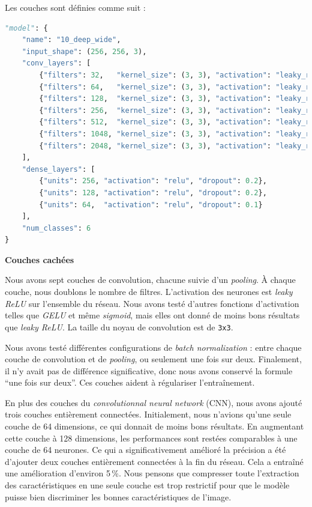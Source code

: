 \documentclass{article}
\begin{document}
Les couches sont définies comme suit :
\begin{lstlisting}[language=Python]
"model": {
    "name": "10_deep_wide",
    "input_shape": (256, 256, 3),
    "conv_layers": [
        {"filters": 32,   "kernel_size": (3, 3), "activation": "leaky_relu", "use_batchnorm": True},
        {"filters": 64,   "kernel_size": (3, 3), "activation": "leaky_relu", "use_batchnorm": False},
        {"filters": 128,  "kernel_size": (3, 3), "activation": "leaky_relu", "use_batchnorm": True},
        {"filters": 256,  "kernel_size": (3, 3), "activation": "leaky_relu", "use_batchnorm": False},
        {"filters": 512,  "kernel_size": (3, 3), "activation": "leaky_relu", "use_batchnorm": True},
        {"filters": 1048, "kernel_size": (3, 3), "activation": "leaky_relu", "use_batchnorm": False},
        {"filters": 2048, "kernel_size": (3, 3), "activation": "leaky_relu", "use_batchnorm": True}
    ],
    "dense_layers": [
        {"units": 256, "activation": "relu", "dropout": 0.2},
        {"units": 128, "activation": "relu", "dropout": 0.2},
        {"units": 64,  "activation": "relu", "dropout": 0.1}
    ],
    "num_classes": 6
}
\end{lstlisting}

\textbf{Couches cachées}

Nous avons sept couches de convolution, chacune suivie d’un \emph{pooling}. À chaque couche, nous doublons le nombre de filtres. L’activation des neurones est \emph{leaky ReLU} sur l’ensemble du réseau. Nous avons testé d’autres fonctions d’activation telles que \emph{GELU} et même \emph{sigmoid}, mais elles ont donné de moins bons résultats que \emph{leaky ReLU}. La taille du noyau de convolution est de \texttt{3x3}.

Nous avons testé différentes configurations de \emph{batch normalization} : entre chaque couche de convolution et de \emph{pooling}, ou seulement une fois sur deux. Finalement, il n’y avait pas de différence significative, donc nous avons conservé la formule ``une fois sur deux''. Ces couches aident à régulariser l’entraînement.

En plus des couches du \emph{convolutionnal neural network} (CNN), nous avons ajouté trois couches entièrement connectées. Initialement, nous n’avions qu’une seule couche de 64 dimensions, ce qui donnait de moins bons résultats. En augmentant cette couche à 128 dimensions, les performances sont restées comparables à une couche de 64 neurones. Ce qui a significativement amélioré la précision a été d’ajouter deux couches entièrement connectées à la fin du réseau. Cela a entraîné une amélioration d’environ 5\,\%. Nous pensons que compresser toute l’extraction des caractéristiques en une seule couche est trop restrictif pour que le modèle puisse bien discriminer les bonnes caractéristiques de l’image.
\end{document}
